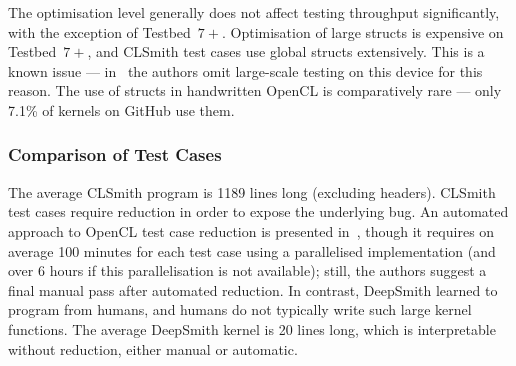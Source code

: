 The optimisation level generally does not affect testing throughput significantly, with the exception of Testbed~$7+$. Optimisation of large structs is expensive on Testbed~$7+$, and CLSmith test cases use global structs extensively. This is a known issue --- in~\cite{Lidbury2015a} the authors omit large-scale testing on this device for this reason. The use of structs in handwritten OpenCL is comparatively rare --- only 7.1\% of kernels on GitHub use them.

\begin{table}
  \centering %
  
  \caption[Results from 48 hours of testing using CLSmith]{%
    Results from 48 hours of testing using CLSmith. System \#. as per Table~\ref{tab:deepsmith-platforms}. $\pm$ denotes optimisations off ($-$) vs on ($+$). The remaining columns denote the number of build crash (\bc), build timeout (\bto), anomalous build failure (\abf), anomalous runtime crash (\arc), anomalous wrong-output (\awo), and pass (\textbf{\cmark}) results.
  }
  \label{tab:megatable-clsmith}
\end{table}

\begin{table}
  \centering %
  
  \caption[Results from 48 hours of testing using DeepSmith]{%
    Results from 48 hours of testing using DeepSmith. System \#. as per Table~\ref{tab:deepsmith-platforms}. $\pm$ denotes optimisations off ($-$) vs on ($+$). The remaining columns denote the number of build crash (\bc), build timeout (\bto), anomalous build failure (\abf), anomalous runtime crash (\arc), anomalous wrong-output (\awo), and pass (\textbf{\cmark}) results.
  }
  \label{tab:megatable-deepsmith}
\end{table}


\subsubsection{Comparison of Test Cases}

The average CLSmith program is 1189 lines long (excluding headers). CLSmith test cases require reduction in order to expose the underlying bug. An automated approach to OpenCL test case reduction is presented in~\cite{Pflanzer2016}, though it requires on average 100 minutes for each test case using a parallelised implementation (and over 6 hours if this parallelisation is not available); still, the authors suggest a final manual pass after automated reduction. In contrast, DeepSmith learned to program from humans, and humans do not typically write such large kernel functions. The average DeepSmith kernel is 20 lines long, which is interpretable without reduction, either manual or automatic.


